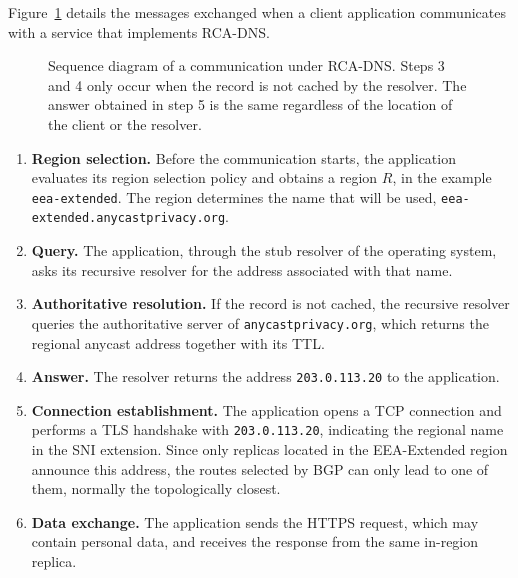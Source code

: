 Figure~\ref{fig:rcadns_sequence} details the messages exchanged when a client application communicates with a service that implements RCA-DNS.

\begin{figure}[ht]
    \centering
    \resizebox{\textwidth}{!}{}
    \caption{Sequence diagram of a communication under RCA-DNS. Steps 3 and 4 only occur when the record is not cached by the resolver. The answer obtained in step 5 is the same regardless of the location of the client or the resolver.}
    \label{fig:rcadns_sequence}
\end{figure}

\begin{enumerate}
    \item \textbf{Region selection.} Before the communication starts, the application evaluates its region selection policy and obtains a region $R$, in the example \texttt{eea-extended}. The region determines the name that will be used, \texttt{eea-extended.anycastprivacy.org}.

    \item \textbf{Query.} The application, through the stub resolver of the operating system, asks its recursive resolver for the address associated with that name.

    \item[3--4.] \textbf{Authoritative resolution.} If the record is not cached, the recursive resolver queries the authoritative server of \texttt{anycastprivacy.org}, which returns the regional anycast address together with its TTL.

    \setcounter{enumi}{4}
    \item \textbf{Answer.} The resolver returns the address \texttt{203.0.113.20} to the application.

    \item \textbf{Connection establishment.} The application opens a TCP connection and performs a TLS handshake with \texttt{203.0.113.20}, indicating the regional name in the SNI extension. Since only replicas located in the EEA-Extended region announce this address, the routes selected by BGP can only lead to one of them, normally the topologically closest.

    \item[7--8.] \textbf{Data exchange.} The application sends the HTTPS request, which may contain personal data, and receives the response from the same in-region replica.
\end{enumerate}

